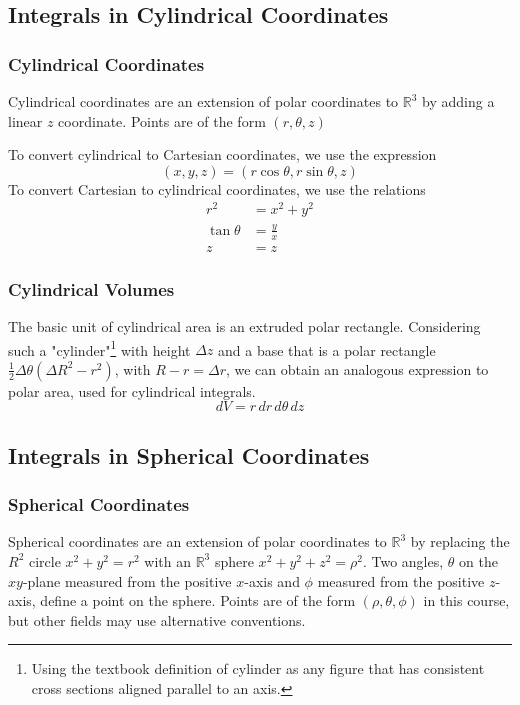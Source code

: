 \documentclass{article}
\begin{document}
\subsection{Integrals in Cylindrical Coordinates}
\subsubsection{Cylindrical Coordinates}
Cylindrical coordinates are an extension of polar coordinates to $\mathbb{R}^3$ by adding a linear $z$ coordinate. Points are of the form $(r,\theta,z)$

To convert cylindrical to Cartesian coordinates, we use the expression
$$(x,y,z)=(r\cos\theta,r\sin\theta,z)$$
To convert Cartesian to cylindrical coordinates, we use the relations
\begin{align*}
    r^2&=x^2+y^2\\
    \tan\theta&=\frac{y}{x}\\
    z&=z
\end{align*}


\subsubsection{Cylindrical Volumes}
The basic unit of cylindrical area is an extruded polar rectangle.
Considering such a "cylinder"\footnote{Using the textbook definition of cylinder as any figure that has consistent cross sections aligned parallel to an axis.} with height $\Delta z$ and a base that is a polar rectangle $\frac{1}{2}\Delta\theta(\Delta R^2-r^2)$, with $R-r = \Delta{r}$, we can obtain an analogous expression to polar area, used for cylindrical integrals.
$$dV=r\,dr\,d\theta\,dz$$

\subsection{Integrals in Spherical Coordinates}
\subsubsection{Spherical Coordinates}
Spherical coordinates are an extension of polar coordinates to $\mathbb{R}^3$ by replacing the $R^2$ circle $x^2+y^2=r^2$ with an $\mathbb{R}^3$ sphere $x^2+y^2+z^2=\rho^2$. Two angles, $\theta$ on the $xy$-plane measured from the positive $x$-axis and $\phi$ measured from the positive $z$-axis, define a point on the sphere. Points are of the form $(\rho,\theta,\phi)$ in this course, but other fields may use alternative conventions.
\end{document}
